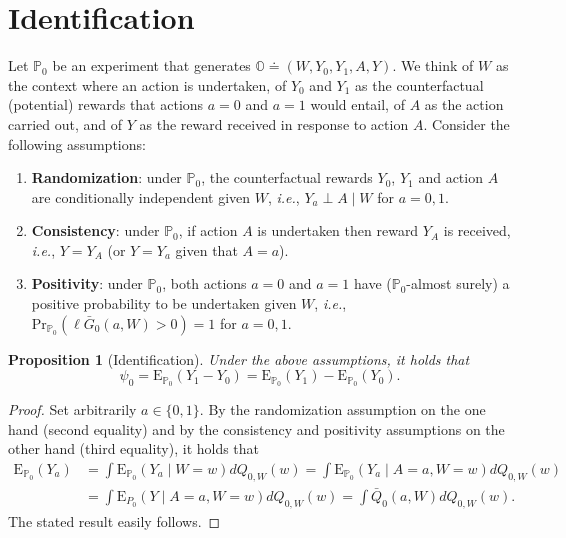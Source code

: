 \documentclass[
  11pt,
  openright,twoside]{book}
\newcommand{\bbO}{\mathbb{O}}
\newcommand{\bbP}{\mathbb{P}}
\newcommand{\defq}{\doteq}
\newcommand{\Exp}{\textrm{E}}
\newcommand{\Gbar}{\bar{G}}
\renewcommand{\Pr}{\textrm{Pr}}
\newcommand{\Qbar}{\bar{Q}}
\newtheorem{proposition}{Proposition}[chapter]
\theoremstyle{definition}
\theoremstyle{definition}
\theoremstyle{definition}
\theoremstyle{definition}
\theoremstyle{remark}
\begin{document}
\hypertarget{identification}{%
\section{Identification}\label{identification}}

Let \(\bbP_{0}\) be an experiment that generates \(\bbO \defq (W, Y_{0}, Y_{1}, A, Y)\). We think of \(W\) as the context where an action is undertaken, of
\(Y_{0}\) and \(Y_{1}\) as the counterfactual (potential) rewards that actions
\(a=0\) and \(a=1\) would entail, of \(A\) as the action carried out, and of \(Y\) as
the reward received in response to action \(A\). Consider the following
assumptions:

\begin{enumerate}
\def\labelenumi{\arabic{enumi}.}
\item
  \textbf{Randomization}: under \(\bbP_{0}\), the counterfactual rewards
  \(Y_0\), \(Y_1\) and action \(A\) are conditionally independent given \(W\), \emph{i.e.},
  \(Y_a \perp A \mid W\) for \(a=0,1\).
\item
  \textbf{Consistency}: under \(\bbP_{0}\), if action \(A\) is undertaken then reward
  \(Y_{A}\) is received, \emph{i.e.}, \(Y = Y_{A}\) (or \(Y=Y_{a}\) given that \(A=a\)).
\item
  \textbf{Positivity}: under \(\bbP_{0}\), both actions \(a=0\) and \(a=1\) have
  (\(\bbP_{0}\)-almost surely) a positive probability to be undertaken given
  \(W\), \emph{i.e.}, \(\Pr_{\bbP_0}(\ell\Gbar_0(a,W) > 0) = 1\) for \(a=0,1\).
\end{enumerate}

\begin{proposition}[Identification]
\protect\hypertarget{prp:unnamed-chunk-2}{}\label{prp:unnamed-chunk-2}Under the above assumptions, it holds that \begin{equation*}  \psi_{0}  =
\Exp_{\bbP_{0}}   \left(Y_{1}   -   Y_{0}\right)  =   \Exp_{\bbP_{0}}(Y_1)   -
\Exp_{\bbP_{0}}(Y_0). \end{equation*}
\end{proposition}

\begin{proof}
Set arbitrarily \(a \in \{0,1\}\). By the randomization assumption on the one
hand (second equality) and by the consistency and positivity assumptions on
the other hand (third equality), it holds that \begin{align*}
\Exp_{\bbP_0}(Y_a) &=  \int \Exp_{\bbP_0}(Y_a \mid  W = w) dQ_{0,W}(w)  = \int
\Exp_{\bbP_0}(Y_a \mid A = a, W =  w) dQ_{0,W}(w) \\ &= \int \Exp_{P_0}(Y \mid
A =  a, W = w)  dQ_{0,W}(w) = \int \Qbar_0(a,W)  dQ_{0,W}(w). \end{align*} The
stated result easily follows.
\end{proof}
\end{document}

